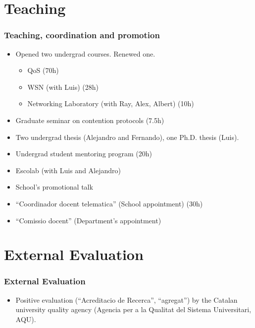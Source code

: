 \documentclass{beamer}
\begin{document}
\section{Teaching}
\begin{frame}
  \frametitle{Teaching, coordination and promotion}
      \begin{block}{}
        \begin{itemize}
          \item Opened two undergrad courses. Renewed one.
          \begin{itemize}
              \item QoS (70h)
              \item WSN (with Luis) (28h)
              \item Networking Laboratory (with Ray, Alex, Albert) (10h)
          \end{itemize}
          \item Graduate seminar on contention protocols (7.5h)
          \item Two undergrad thesis (Alejandro and Fernando), one Ph.D. thesis (Luis).
          \item Undergrad student mentoring program (20h)
          \item Escolab (with Luis and Alejandro)
          \item School's promotional talk
          \item ``Coordinador docent telematica'' (School appointment) (30h)
          \item ``Comissio docent'' (Department's appointment)
        \end{itemize}
      \end{block}
\end{frame}


\section{External Evaluation}
\begin{frame}
  \frametitle{External Evaluation}
      \begin{block}{}
        \begin{itemize}
          \item Positive evaluation (``Acreditacio de Recerca'', ``agregat'') by the Catalan university quality agency (Agencia per a la Qualitat del Sistema Universitari, AQU).
        \end{itemize}
      \end{block}
\end{frame}
\end{document}
